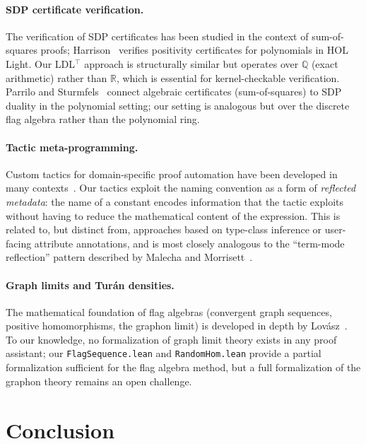 \documentclass{article}
\newcommand{\lean}[1]{\texttt{#1}}
\begin{document}
\paragraph{SDP certificate verification.}
The verification of SDP certificates has been studied in the context of
sum-of-squares proofs; Harrison~\cite{harrison2007verifying} verifies
positivity certificates for polynomials in HOL Light.  Our LDL$^\top$ approach
is structurally similar but operates over $\mathbb{Q}$ (exact arithmetic) rather
than $\mathbb{R}$, which is essential for kernel-checkable verification.
Parrilo and Sturmfels~\cite{parrilo2003minimizing} connect algebraic
certificates (sum-of-squares) to SDP duality in the polynomial setting;
our setting is analogous but over the discrete flag algebra rather than the
polynomial ring.

\paragraph{Tactic meta-programming.}
Custom tactics for domain-specific proof automation have been developed in many
contexts~\cite{ebner2017structured,sozeau2008coq}.  Our tactics exploit the
naming convention as a form of \emph{reflected metadata}: the name of a
constant encodes information that the tactic exploits without having to reduce
the mathematical content of the expression.  This is related to, but distinct
from, approaches based on type-class inference or user-facing attribute
annotations, and is most closely analogous to the ``term-mode reflection''
pattern described by Malecha and Morrisett~\cite{malecha2014towards}.

\paragraph{Graph limits and Turán densities.}
The mathematical foundation of flag algebras (convergent graph sequences,
positive homomorphisms, the graphon limit) is developed in depth by
Lov\'asz~\cite{lovasz2012large}.  To our knowledge, no formalization of
graph limit theory exists in any proof assistant; our \lean{FlagSequence.lean}
and \lean{RandomHom.lean} provide a partial formalization sufficient for the
flag algebra method, but a full formalization of the graphon theory remains
an open challenge.


\section{Conclusion}
\label{sec:conclusion}
\end{document}
